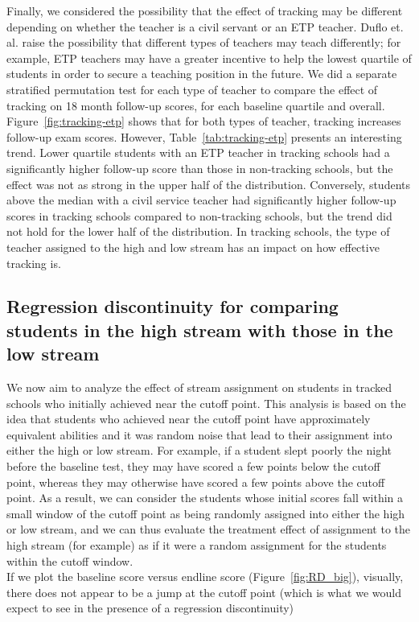\documentclass[11pt]{article}
\begin{document}
Finally, we considered the possibility that the effect of tracking may be different depending on whether the teacher is a civil servant or an ETP teacher. Duflo et. al. raise the possibility that different types of teachers may teach differently; for example, ETP teachers may have a greater incentive to help the lowest quartile of students in order to secure a teaching position in the future. We did a separate stratified permutation test for each type of teacher to compare the effect of tracking on 18 month follow-up scores, for each baseline quartile and overall.  Figure~\ref{fig:tracking-etp} shows that for both types of teacher, tracking increases follow-up exam scores.  However, Table~\ref{tab:tracking-etp} presents an interesting trend.  Lower quartile students with an ETP teacher in tracking schools had a significantly higher follow-up score than those in non-tracking schools, but the effect was not as strong in the upper half of the distribution.  Conversely, students above the median with a civil service teacher had significantly higher follow-up scores in tracking schools compared to non-tracking schools, but the trend did not hold for the lower half of the distribution.  In tracking schools, the type of teacher assigned to the high and low stream has an impact on how effective tracking is.


 \subsection{Regression discontinuity for comparing students in the high stream with those in the low stream}
We now aim to analyze the effect of stream assignment on students in tracked schools who initially achieved near the cutoff point. This analysis is based on the idea that students who achieved near the cutoff point have approximately equivalent abilities and it was random noise that lead to their assignment into either the high or low stream. For example, if a student slept poorly the night before the baseline test, they may have scored a few points below the cutoff point, whereas they may otherwise have scored a few points above the cutoff point. As a result, we can consider the students whose initial scores fall within a small window of the cutoff point as being randomly assigned into either the high or low stream, and we can thus evaluate the treatment effect of assignment to the high stream (for example) as if it were a random assignment for the students within the cutoff window.\\
If we plot the baseline score versus endline score (Figure~\ref{fig:RD_big}), visually, there does not appear to be a jump at the cutoff point (which is what we would expect to see in the presence of a regression discontinuity)
\end{document}
